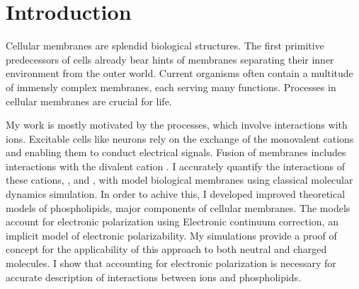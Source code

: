 \chapter*{Introduction}

Cellular membranes are splendid biological structures. 
The first primitive predecessors of cells already bear hints of membranes 
separating their inner environment from the outer world. 
Current organisms often contain a multitude of immensly complex membranes, 
each serving many functions. 
Processes in cellular membranes are crucial for life. 

My work is mostly motivated by the processes,
which involve interactions with ions. 
Excitable cells like neurons 
rely on the exchange of the monovalent cations  and 
enabling them to conduct electrical signals. 
Fusion of membranes includes interactions with the divalent cation .
I accurately quantify the interactions of these cations, 
,  and ,
with model biological membranes
using classical molecular dynamics simulation. 
In order to achive this,
I developed improved theoretical models
of phospholipids, major components of cellular membranes.
The models account for electronic polarization
using Electronic continuum correction,  
an implicit model of electronic polarizability. 
My simulations provide a proof of concept 
for the applicability of this approach 
to both neutral and charged molecules. 
I show that accounting for electronic polarization 
is necessary for accurate description of interactions 
between ions and phospholipids. 


